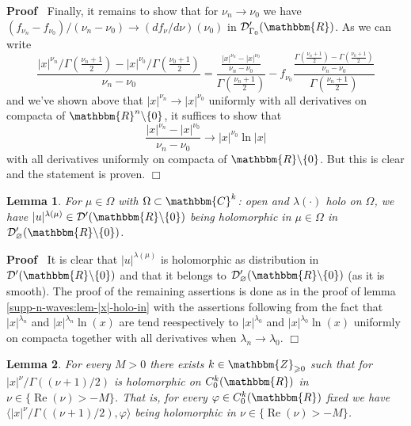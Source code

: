 \documentclass{article}
\newcommand{\tmop}[1]{\ensuremath{\operatorname{#1}}}
\newenvironment{proof}{\noindent\textbf{Proof\ }}{\hspace*{\fill}$\Box$\medskip}
\numberwithin{definition}{section}
\newtheorem{lemma}{Lemma}
\numberwithin{lemma}{section}
\numberwithin{proposition}{section}
{\theorembodyfont{\rmfamily}\newtheorem{remark}{Remark}
\numberwithin{remark}{section}
}
\begin{document}
\begin{proof}
  Finally, it remains to show that for $\nu_n \rightarrow \nu_0$ we have $(
  f_{\nu_n} - f_{\nu_0}) / ( \nu_n - \nu_0) \rightarrow ( d f_{\nu} / d \nu) (
  \nu_0)$ in $\mathcal{D}'_{\Gamma_0} ( \mathbbm{R})$. As we can write
  \[ \frac{| x |^{\nu_n} / \Gamma \left( \frac{\nu_n + 1}{2} \right) - | x
     |^{\nu_0} / \Gamma \left( \frac{\nu_0 + 1}{2} \right)}{\nu_n - \nu_0} =
     \frac{\frac{| x |^{\nu_n} - | x |^{\nu_0}}{\nu_n - \nu_0}}{\Gamma \left(
     \frac{\nu_n + 1}{2} \right)} - f_{\nu_0} \frac{\frac{\Gamma \left(
     \frac{\nu_n + 1}{2} \right) - \Gamma \left( \frac{\nu_0 + 1}{2}
     \right)}{\nu_n - \nu_0}}{\Gamma \left( \frac{\nu_n + 1}{2} \right)} \]
  and we've shown above that $| x |^{\nu_n} \rightarrow | x |^{\nu_0}$
  uniformly with all derivatives on compacta of $\mathbbm{R}^n \backslash \{ 0
  \}$, it suffices to show that
  \[ \frac{| x |^{\nu_n} - | x |^{\nu_0}}{\nu_n - \nu_0} \rightarrow | x
     |^{\nu_0} \ln | x | \]
  with all derivatives uniformly on compacta of $\mathbbm{R}\backslash \{ 0
  \}$. But this is clear and the statement is proven.
\end{proof}

\begin{lemma}
  \label{k-finite:lem-abs-is-holo}For $\mu \in \Omega$ with $\Omega \subset
  \mathbbm{C}^k$: open and $\lambda ( \cdot)$ holo on $\Omega$, we have $| u
  |^{\lambda ( \mu)} \in \mathcal{D}' ( \mathbbm{R}\backslash \{ 0 \})$ being
  holomorphic in $\mu \in \Omega$ in $\mathcal{D}'_{\varnothing} (
  \mathbbm{R}\backslash \{ 0 \})$.
\end{lemma}

\begin{proof}
  It is clear that $| u |^{\lambda ( \mu)}$ is holomorphic as distribution in
  $\mathcal{D}' ( \mathbbm{R}\backslash \{ 0 \})$ and that it belongs to
  $\mathcal{D}'_{\varnothing} ( \mathbbm{R}\backslash \{ 0 \})$ (as it is
  smooth). The proof of the remaining assertions is done as in the proof of
  lemma \ref{supp-n-waves:lem-|x|-holo-in} with the assertions following from
  the fact that $| x |^{\lambda_n}$ and $| x |^{\lambda_n} \ln ( x)$ are tend
  reespectively to $| x |^{\lambda_0}$ and $| x |^{\lambda_0} \ln ( x)$
  uniformly on compacta together with all derivatives when $\lambda_n
  \rightarrow \lambda_0$.
\end{proof}

\begin{lemma}
  \label{k-finite:lem-1}For every $M > 0$ there exists $k \in
  \mathbbm{Z}_{\geqslant 0}$ such that for $| x |^{\nu} / \Gamma ( ( \nu + 1)
  / 2)$ is holomorphic on $C^k_0 ( \mathbbm{R})$ in $\nu \in \{ \tmop{Re} (
  \nu) > - M \}$. That is, for every $\varphi \in C^k_0 ( \mathbbm{R})$ fixed
  we have $\langle | x |^{\nu} / \Gamma ( ( \nu + 1) / 2), \varphi \rangle$
  being holomorphic in $\nu \in \{ \tmop{Re} ( \nu) > - M \}$.
\end{lemma}
\end{document}
